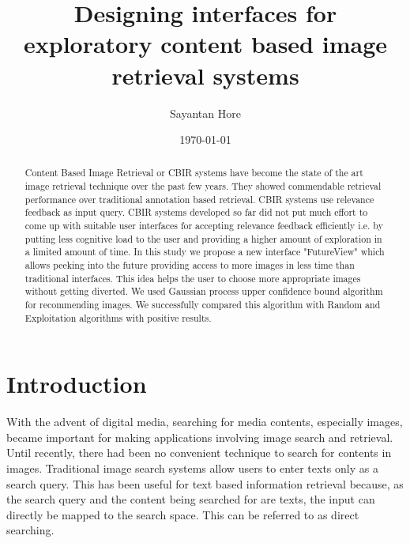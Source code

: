 \documentclass[english]{tktltiki}
\begin{document}
\onehalfspacing

\title{Designing interfaces for exploratory content based image retrieval systems}
\author{Sayantan Hore}
\date{\today}

\maketitle



\begin{abstract}

Content Based Image Retrieval or CBIR systems have become the state of the art image retrieval technique over the past few years. They showed commendable retrieval performance over traditional annotation based retrieval. CBIR systems use relevance feedback as input query. CBIR systems developed so far did not put much effort to come up with suitable user interfaces for accepting relevance feedback efficiently i.e. by putting less cognitive load to the user and providing a higher amount of exploration in a limited amount of time. In this study we propose a new interface "FutureView" which allows peeking into the future providing access to more images in less time than traditional interfaces. This idea helps the user to choose more appropriate images without getting diverted. We used Gaussian process upper confidence bound algorithm for recommending images. We successfully compared this algorithm with Random and Exploitation algorithms with positive results.

\end{abstract}

\mytableofcontents




\section{Introduction}

With the advent of digital media, searching for media contents, especially images, became important for making applications involving image search and retrieval. Until recently, there had been no convenient technique to search for contents in images. Traditional image search systems allow users to enter texts only as a search query. This has been useful for text based information retrieval because, as the search query and the content being searched for are texts, the input can directly be mapped to the search space. This can be referred to as direct searching.
\end{document}
